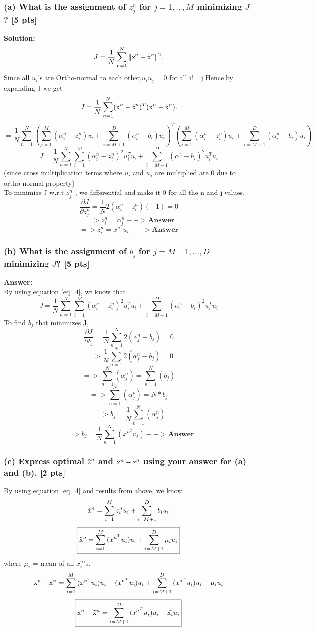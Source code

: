 \documentclass[twoside,10pt]{article}
\begin{document}
\subsubsection*{(a) What is the assignment of $z_j^n$ for $j=1, ..., M$ minimizing $J$? [5 pts]}
\textbf{Solution:}\\
$$J = \frac{1}{N} \sum_{n=1}^N \| \text x^n - \tilde{\text x}^n \|^2. $$
Since all $u_i$'s are Ortho-normal to each other,$u_i u_j = 0$ for all i!= j
Hence by expanding J we get
$$J = \frac{1}{N} \sum_{n=1}^N ( \text x^n - \tilde{\text x}^n )^T ( \text x^n - \tilde{\text x}^n ). $$
$$  = \frac{1}{N} \sum_{n=1}^N{(\sum_{i=1}^M{(\alpha_i^n - z_i^n)u_i} + \sum_{i=M+1}^D{(\alpha_i^n - b_i)u_i})^T(\sum_{i=1}^M{(\alpha_i^n - z_i^n)u_i} + \sum_{i=M+1}^D{(\alpha_i^n - b_i)u_i})}$$
\begin{equation}\label{eq_4}
J  = \frac{1}{N} \sum_{n=1}^N{\sum_{i=1}^M{(\alpha_i^n - z_i^n)^2u_i^T u_i} + \sum_{i=M+1}^D{(\alpha_i^n - b_i)^2u_i^T u_i}}
\end{equation}
(since cross multiplication terms where $u_i$ and $u_j$ are multiplied are 0 due to ortho-normal property)\\
\hspace{1cm}
To minimize J w.r.t $z_j^n$ , we differential and make it 0 for all the n and j values.
$$\frac{\partial J}{\partial z_j^n} = \frac{1}{N}2(\alpha_i^n - z_i^n)(-1) = 0$$
$$=> \boxed{z_i^n = \alpha_i^n} --> \textbf{Answer} $$
$$=> \boxed{z_i^n = x^{n^T}u_i} --> \textbf{Answer} $$


\subsubsection*{(b) What is the assignment of $b_j$ for $j=M+1, ..., D$ minimizing $J$? [5 pts]}
\textbf{Answer:}\\
By using equation \ref{eq_4}, we know that 
$$J  = \frac{1}{N} \sum_{n=1}^N{\sum_{i=1}^M{(\alpha_i^n - z_i^n)^2u_i^T u_i} + \sum_{i=M+1}^D{(\alpha_i^n - b_i)^2u_i^T u_i}}$$
To find $b_j$ that minimizes J,
$$\frac{\partial J}{\partial b_j} = \frac{1}{N}\sum_{n=1}^N{2(\alpha_j^n - b_j)} = 0 $$
$$=> \frac{1}{N}\sum_{n=1}^N{2(\alpha_j^n - b_j)} = 0 $$
$$=> \sum_{n=1}^N{(\alpha_j^n)} = \sum_{n=1}^N{(b_j)}  $$
$$=> \sum_{n=1}^N{(\alpha_j^n)} = N*b_j  $$
$$=> \boxed{b_j = \frac{1}{N}\sum_{n=1}^N{(\alpha_j^n)}}  $$
$$=> \boxed{b_j = \frac{1}{N}\sum_{n=1}^N{(x^{n^T}u_j)}}  -->\textbf{Answer}$$



\subsubsection*{(c) Express optimal $\tilde{\text x}^n$ and $\text x^n - \tilde{\text x}^n$ using your answer for (a) and (b). [2 pts]}
By using equation \ref{eq_4} and results from above, we know 
$$\tilde{\text x}^n = \sum_{i=1}^M{z_i^nu_i} + \sum_{i=M+1}^D{b_iu_i}$$
$$\boxed{\tilde{\text x}^n = \sum_{i=1}^M{(x^{n^T}u_i)u_i} + \sum_{i=M+1}^D{\mu_iu_i}}$$
where $\mu_i$ = mean of all $x_i^n$'s. 
$$\text x^n - \tilde{\text x}^n = \sum_{i=1}^M{(x^{n^T}u_i)u_i - (x^{n^T}u_i)u_i} + \sum_{i=M+1}^D{(x^{n^T}u_i)u_i - \mu_iu_i}$$
$$\boxed{\text x^n - \tilde{\text x}^n = \sum_{i=M+1}^D{(x^{n^T}u_i)u_i - \bar{\text x_i}u_i}}$$
\end{document}
